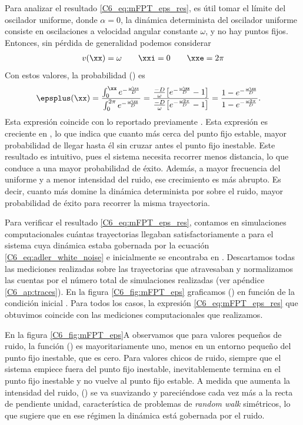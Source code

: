 {Para analizar el resultado \ref{C6_eq:mFPT_eps_res}, es útil tomar el límite del oscilador uniforme, donde $\alpha = 0$, la dinámica determinista del oscilador uniforme consiste en oscilaciones a velocidad angular constante $\omega$, y no hay puntos fijos. Entonces, sin pérdida de generalidad podemos considerar
\begin{align}
    v(\xx) = \omega \qquad 
    \xxi = 0 \qquad \xxe = 2 \pi
    \label{C6_eq:mFPT_uniforme}
\end{align}
Con estos valores, la probabilidad \epsplus(\xx) es
\begin{align}
     \epsplus(\xx) & = \frac{\int_{0}^\xx e^{- \frac{\omega \xx}{D}}}{\int_{0}^{2\pi} e^{- \frac{\omega \xx}{D}}}
      = \frac{\frac{-D}{\omega} \big[e^{- \frac{\omega \xx}{D}} - 1\big]}{\frac{-D}{\omega} \big[e^{- \frac{\omega 2\pi}{D}} - 1\big]} = \frac{ 1 - e^{- \frac{\omega \xx}{D}}}{1- e^{- \frac{\omega 2\pi}{D}}}.
\end{align}
Esta expresión coincide con lo reportado previamente \cite{Redner2001}. Esta expresión es creciente en \xx, lo que indica que cuanto más cerca del punto fijo estable, mayor probabilidad de llegar hasta él sin cruzar antes el punto fijo inestable. Este resultado es intuitivo, pues el sistema necesita recorrer menos distancia, lo que conduce a una mayor probabilidad de éxito. Además, a mayor frecuencia del uniforme y a menor intensidad del ruido, ese crecimiento es más abrupto. Es decir, cuanto más domine la dinámica determinista por sobre el ruido, mayor probabilidad de éxito para recorrer la misma trayectoria. 


Para verificar el resultado \ref{C6_eq:mFPT_eps_res}, contamos en simulaciones computacionales cuántas trayectorias llegaban satisfactoriamente a \xxe para el sistema cuya dinámica estaba gobernada por la ecuación \ref{C6_eq:adler_white_noise} e inicialmente se encontraba en \xx. Descartamos todas las mediciones realizadas sobre las trayectorias que atravesaban \xxi y normalizamos las cuentas por el número total de simulaciones realizadas (ver apéndice \ref{C6_ap:traces}). En la figura \ref{C6_fig:mFPT_eps} graficamos \epsplus(\xx) en función de la condición inicial \xx. Para todos los casos, la expresión \ref{C6_eq:mFPT_eps_res} que obtuvimos coincide con las mediciones computacionales que realizamos.


En la figura \ref{C6_fig:mFPT_eps}A observamos que para valores pequeños de ruido, la función \epsplus(\xx) es mayoritariamente uno, menos en un entorno pequeño del punto fijo inestable, que es cero. Para valores chicos de ruido, siempre que el sistema empiece fuera del punto fijo inestable, inevitablemente termina en el punto fijo inestable y no vuelve al punto fijo estable. A medida que aumenta la intensidad del ruido, \epsplus(\xx) se va suavizando y pareciéndose cada vez más a la recta de pendiente unidad, característica de problemas de \textit{random walk} simétricos, lo que sugiere que en ese régimen la dinámica está gobernada por el ruido. 


}
